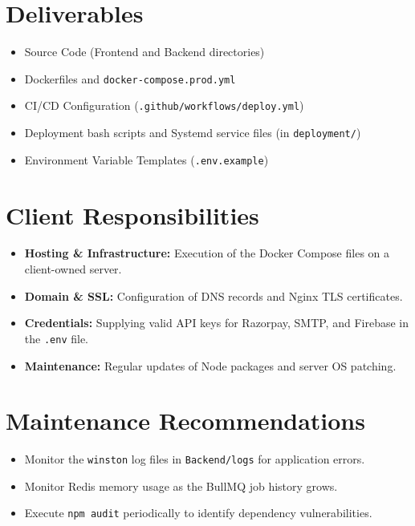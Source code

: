 \documentclass[11pt,a4paper]{article}
\begin{document}
\section{Deliverables}
\begin{itemize}[leftmargin=*]
    \item Source Code (Frontend and Backend directories)
    \item Dockerfiles and \texttt{docker-compose.prod.yml}
    \item CI/CD Configuration (\texttt{.github/workflows/deploy.yml})
    \item Deployment bash scripts and Systemd service files (in \texttt{deployment/})
    \item Environment Variable Templates (\texttt{.env.example})
\end{itemize}

\section{Client Responsibilities}
\begin{itemize}[leftmargin=*]
    \item \textbf{Hosting \& Infrastructure:} Execution of the Docker Compose
          files on a client-owned server.
    \item \textbf{Domain \& SSL:} Configuration of DNS records and Nginx TLS
          certificates.
    \item \textbf{Credentials:} Supplying valid API keys for Razorpay, SMTP,
          and Firebase in the \texttt{.env} file.
    \item \textbf{Maintenance:} Regular updates of Node packages and server
          OS patching.
\end{itemize}

\section{Maintenance Recommendations}
\begin{itemize}[leftmargin=*]
    \item Monitor the \texttt{winston} log files in \texttt{Backend/logs} for
          application errors.
    \item Monitor Redis memory usage as the BullMQ job history grows.
    \item Execute \texttt{npm audit} periodically to identify dependency
          vulnerabilities.
\end{itemize}
\end{document}
